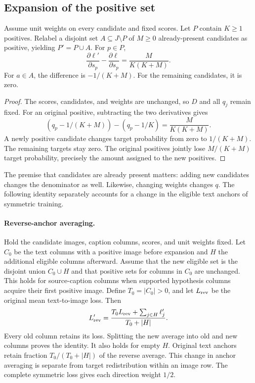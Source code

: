 \subsection{Expansion of the positive set}
\begin{proposition}
Assume unit weights on every candidate and fixed scores. Let $P$ contain $K\geq1$ positives. Relabel a disjoint set $A\subseteq J\setminus P$ of $M\geq0$ already-present candidates as positive, yielding $P'=P\cup A$. For $p\in P$,
\begin{equation}
\frac{\partial\ell'}{\partial s_p}-\frac{\partial\ell}{\partial s_p}=\frac{M}{K(K+M)}.
\end{equation}
For $a\in A$, the difference is $-1/(K+M)$. For the remaining candidates, it is zero.
\end{proposition}
\begin{proof}
The scores, candidates, and weights are unchanged, so $D$ and all $q_j$ remain fixed. For an original positive, subtracting the two derivatives gives
\begin{equation}
(q_p-1/(K+M))-(q_p-1/K)=\frac{M}{K(K+M)}.
\end{equation}
A newly positive candidate changes target probability from zero to $1/(K+M)$. The remaining targets stay zero. The original positives jointly lose $M/(K+M)$ target probability, precisely the amount assigned to the new positives.
\end{proof}
The premise that candidates are already present matters: adding new candidates changes the denominator as well. Likewise, changing weights changes $q$. The following identity separately accounts for a change in the eligible text anchors of symmetric training.

\paragraph{Reverse-anchor averaging.}
Hold the candidate images, caption columns, scores, and unit weights fixed. Let $C_0$ be the text columns with a positive image before expansion and $H$ the additional eligible columns afterward. Assume that the new eligible set is the disjoint union $C_0\cup H$ and that positive sets for columns in $C_0$ are unchanged. This holds for source-caption columns when supported hypothesis columns acquire their first positive image. Define $T_0=|C_0|>0$, and let $L_{\rm rev}$ be the original mean text-to-image loss. Then
\begin{equation}
L'_{\rm rev}=\frac{T_0L_{\rm rev}+\sum_{j\in H}\ell'_j}{T_0+|H|}.
\end{equation}
Every old column retains its loss. Splitting the new average into old and new columns proves the identity. It also holds for empty $H$. Original text anchors retain fraction $T_0/(T_0+|H|)$ of the reverse average. This change in anchor averaging is separate from target redistribution within an image row. The complete symmetric loss gives each direction weight $1/2$.

